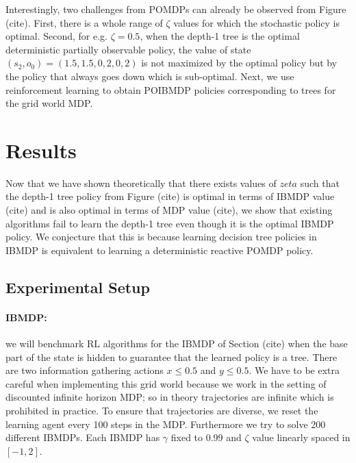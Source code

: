 Interestingly, two challenges from POMDPs can already be observed from Figure (cite). 
First, there is a whole range of $\zeta$ values for which the stochastic policy is optimal.
Second, for e.g. $\zeta=0.5$, when the depth-1 tree is the optimal deterministic partially observable policy, the value of state $(s_2, o_0) = (1.5, 1.5, 0, 2, 0, 2)$ is not maximized by the optimal policy but by the policy that always goes down which is sub-optimal.
Next, we use reinforcement learning to obtain POIBMDP policies corresponding to trees for the grid world MDP.

\section{Results}

Now that we have shown theoretically that there exists values of $zeta$ such that the depth-1 tree policy from Figure (cite) is optimal in terms of IBMDP value (cite) and is also optimal in terms of MDP value (cite),
we show that existing algorithms fail to learn the depth-1 tree even though it is the optimal IBMDP policy.
We conjecture that this is because learning decision tree policies in IBMDP is equivalent to learning a deterministic reactive POMDP policy.

\subsection{Experimental Setup}
\paragraph{IBMDP:} we will benchmark RL algorithms for the IBMDP of Section (cite) when the base part of the state is hidden to guarantee that the learned policy is a tree.
There are two information gathering actions $x\leq0.5$ and $y\leq0.5$.
We have to be extra careful when implementing this grid world because we work in the setting of discounted infinite horizon MDP; so in theory trajectories are infinite which is prohibited in practice.
To ensure that trajectories are diverse, we reset the learning agent every 100 steps in the MDP.
Furthermore we try to solve 200 different IBMDPs. Each IBMDP has $\gamma$ fixed to 0.99 and $\zeta$ value linearly spaced in $[-1, 2]$.
